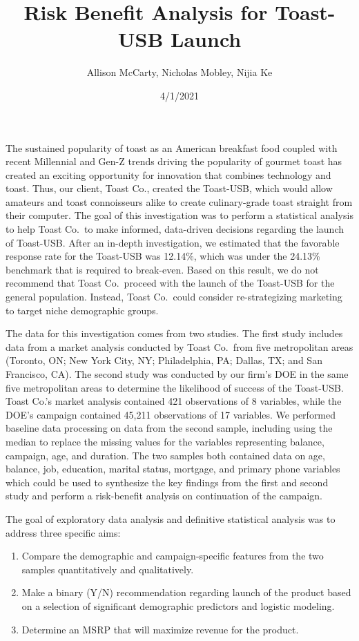 \documentclass[]{article}
\title{Risk Benefit Analysis for Toast-USB Launch}
\author{Allison McCarty, Nicholas Mobley, Nijia Ke}
\date{4/1/2021}
\begin{document}
\maketitle

The sustained popularity of toast as an American breakfast food coupled
with recent Millennial and Gen-Z trends driving the popularity of
gourmet toast has created an exciting opportunity for innovation that
combines technology and toast. Thus, our client, Toast Co., created the
Toast-USB, which would allow amateurs and toast connoisseurs alike to
create culinary-grade toast straight from their computer. The goal of
this investigation was to perform a statistical analysis to help Toast
Co.~to make informed, data-driven decisions regarding the launch of
Toast-USB. After an in-depth investigation, we estimated that the
favorable response rate for the Toast-USB was 12.14\%, which was under
the 24.13\% benchmark that is required to break-even. Based on this
result, we do not recommend that Toast Co.~proceed with the launch of
the Toast-USB for the general population. Instead, Toast Co.~could
consider re-strategizing marketing to target niche demographic groups.

The data for this investigation comes from two studies. The first study
includes data from a market analysis conducted by Toast Co.~from five
metropolitan areas (Toronto, ON; New York City, NY; Philadelphia, PA;
Dallas, TX; and San Francisco, CA). The second study was conducted by
our firm's DOE in the same five metropolitan areas to determine the
likelihood of success of the Toast-USB. Toast Co.'s market analysis
contained 421 observations of 8 variables, while the DOE's campaign
contained 45,211 observations of 17 variables. We performed baseline
data processing on data from the second sample, including using the
median to replace the missing values for the variables representing
balance, campaign, age, and duration. The two samples both contained
data on age, balance, job, education, marital status, mortgage, and
primary phone variables which could be used to synthesize the key
findings from the first and second study and perform a risk-benefit
analysis on continuation of the campaign.

The goal of exploratory data analysis and definitive statistical
analysis was to address three specific aims:

\begin{enumerate}
\def\labelenumi{\arabic{enumi}.}
\item
  Compare the demographic and campaign-specific features from the two
  samples quantitatively and qualitatively.
\item
  Make a binary (Y/N) recommendation regarding launch of the product
  based on a selection of significant demographic predictors and
  logistic modeling.
\item
  Determine an MSRP that will maximize revenue for the product.
\end{enumerate}
\end{document}
